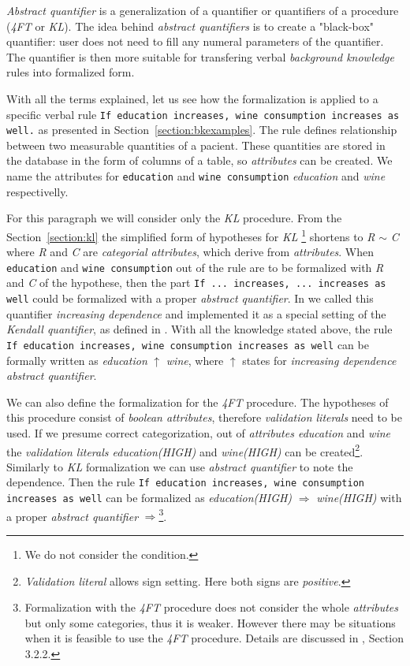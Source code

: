 \documentclass{llncs}
\begin{document}
\medskip
\emph{Abstract quantifier} is a generalization of a quantifier or quantifiers of 
a procedure (\emph{4FT} or \emph{KL}). The idea behind \emph{abstract quantifiers}
is to create a "black-box" quantifier: user does not need to fill any numeral 
parameters of the quantifier. The quantifier is then more suitable for transfering
verbal \emph{background knowledge} rules into formalized form.

\medskip
With all the terms explained, let us see how the formalization is applied to 
a specific verbal rule \texttt{If education increases, wine consumption increases as well.}
as presented in Section~\ref{section:bkexamples}. The rule defines relationship
between two measurable quantities of a pacient. These quantities are stored in the
database in the form of columns of a table, so \emph{attributes} can be created.
We name the attributes for \texttt{education} and \texttt{wine consumption}
\emph{education} and \emph{wine} respectivelly.

For this paragraph we will consider only the \emph{KL} procedure. From the 
Section~\ref{section:kl} the simplified form of hypotheses for \emph{KL}
\footnote{We do not consider the condition.} shortens to \emph{R} $\sim$ \emph{C} 
where \emph{R} and \emph{C} are \emph{categorial attributes}, which derive
from \emph{attributes}. When \texttt{education} and \texttt{wine consumption}
out of the rule are to be formalized with \emph{R} and \emph{C} of the hypothese,
then the part \texttt{If ... increases, ... increases as well} could be formalized with
a proper \emph{abstract quantifier}. In \cite{Diplomka} we called this quantifier
\emph{increasing dependence} and implemented it as a special setting of the 
\emph{Kendall quantifier}, as defined in \cite{KLKvant}. With all the knowledge
stated above, the rule \texttt{If education increases, wine consumption increases
as well} can be formally written as \emph{education} $\uparrow$ \emph{wine}, where
$\uparrow$ states for \emph{increasing dependence abstract quantifier}.

We can also define the formalization for the \emph{4FT} procedure. The hypotheses
of this procedure consist of \emph{boolean attributes}, therefore \emph{validation
literals} need to be used. If we presume correct categorization, out of
\emph{attributes education} and \emph{wine} the \emph{validation literals
education(HIGH)} and \emph{wine(HIGH)} can be created\footnote{\emph{Validation
literal} allows sign setting. Here both signs are \emph{positive}.}. Similarly
to \emph{KL} formalization we can use \emph{abstract quantifier} to 
note the dependence. Then the rule \texttt{If education increases, wine consumption
increases as well} can be formalized as \emph{education(HIGH)} $\Rightarrow$
\emph{wine(HIGH)} with a proper \emph{abstract quantifier} $\Rightarrow$\footnote{
Formalization with the \emph{4FT} procedure does not consider the whole \emph{attributes}
but only some categories, thus it is weaker. However there may be situations 
when it is feasible to use the \emph{4FT} procedure. Details are discussed in
\cite{Diplomka}, Section 3.2.2.}. 
\end{document}
